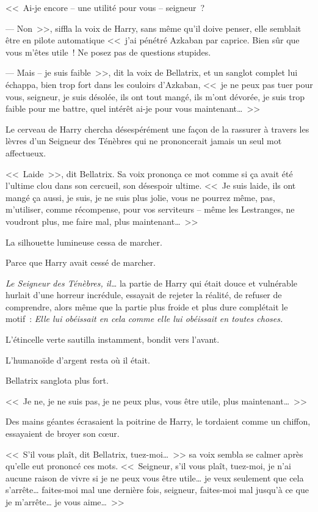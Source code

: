 <<~Ai-je encore -- une utilité pour vous -- seigneur~?

--- Non~>>, siffla la voix de Harry, sans même qu'il doive penser, elle semblait être en pilote automatique <<~j'ai pénétré Azkaban par caprice. Bien sûr que vous m'êtes utile~! Ne posez pas de questions stupides.

--- Mais -- je suis faible~>>, dit la voix de Bellatrix, et un sanglot complet lui échappa, bien trop fort dans les couloirs d'Azkaban, <<~je ne peux pas tuer pour vous, seigneur, je suis désolée, ils ont tout mangé, ils m'ont dévorée, je suis trop faible pour me battre, quel intérêt ai-je pour vous maintenant…~>>

Le cerveau de Harry chercha désespérément une façon de la rassurer à travers les lèvres d'un Seigneur des Ténèbres qui ne prononcerait jamais un seul mot affectueux.

<<~Laide~>>, dit Bellatrix. Sa voix prononça ce mot comme si ça avait été l'ultime clou dans son cercueil, son désespoir ultime. <<~Je suis laide, ils ont mangé ça aussi, je suis, je ne suis plus jolie, vous ne pourrez même, pas, m'utiliser, comme récompense, pour vos serviteurs -- même les Lestranges, ne voudront plus, me faire mal, plus maintenant…~>>

La silhouette lumineuse cessa de marcher.

Parce que Harry avait cessé de marcher.

\emph{Le Seigneur des Ténèbres, il…} la partie de Harry qui était douce et vulnérable hurlait d'une horreur incrédule, essayait de rejeter la réalité, de refuser de comprendre, alors même que la partie plus froide et plus dure complétait le motif~: \emph{Elle lui obéissait en cela comme elle lui obéissait en toutes choses.}

L'étincelle verte sautilla instamment, bondit vers l'avant.

L'humanoïde d'argent resta où il était.

Bellatrix sanglota plus fort.

<<~Je ne, je ne suis pas, je ne peux plus, vous être utile, plus maintenant…~>>

Des mains géantes écrasaient la poitrine de Harry, le tordaient comme un chiffon, essayaient de broyer son cœur.

<<~S'il vous plaît, dit Bellatrix, tuez-moi…~>> sa voix sembla se calmer après qu'elle eut prononcé ces mots. <<~Seigneur, s'il vous plaît, tuez-moi, je n'ai aucune raison de vivre si je ne peux vous être utile… je veux seulement que cela s'arrête… faites-moi mal une dernière fois, seigneur, faites-moi mal jusqu'à ce que je m'arrête… je vous aime…~>>

